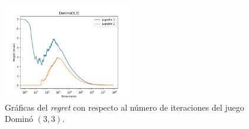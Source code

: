 \begin{figure}[h]
    \centering
    \includegraphics[width=0.5\textwidth]{graficas/cfr/domino/Domino(3,3).png}
    \caption{Gráficas del \textit{regret} con respecto al número de iteraciones del juego Dominó $(3, 3)$.}
    \label{fig:cfr-regret-domino-3-3}
\end{figure}
